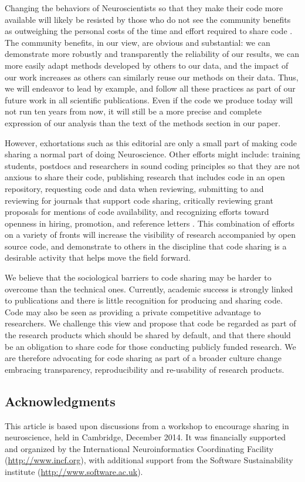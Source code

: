 \documentclass[11pt]{article}
\begin{document}
Changing the behaviors of Neuroscientists so that they make their code more available will likely be resisted by those who do not see the community benefits as outweighing the personal costs of the time and effort required to share code \cite{stodden2010scientific}. The community benefits, in our view, are obvious and substantial: we can demonstrate more robustly and transparently the reliability of our results, we can more easily adapt methods developed by others to our data, and the impact of our work increases as others can similarly reuse our methods on their data. Thus, we will endeavor to lead by example, and follow all these practices as part of our future work in all scientific publications. Even if the code we produce today will not run ten years from now, it will still be a more precise and complete expression of our analysis than the text of the methods section in our paper. 

However, exhortations such as this editorial are only a small part of making code sharing a normal part of doing Neuroscience. Other efforts might include: training students,  postdocs and researchers in sound coding principles so that they are not anxious to share their code, publishing research that includes code in an open repository, requesting code and data when reviewing, submitting to and reviewing for journals that support code sharing, critically reviewing grant proposals
 for mentions of code availability, and recognizing efforts toward openness in hiring, promotion, and reference letters \cite{leveque2012reproducible}. This combination of efforts on a variety of fronts will increase the visibility of research accompanied by open source code, and demonstrate to others in the discipline that code sharing is a desirable activity that helps move the field forward. 

We believe that the sociological barriers to code sharing may be harder to overcome than the technical ones. Currently, academic success is strongly linked to publications and there is little recognition for producing and sharing code. Code may also be seen as providing a private competitive advantage to researchers. We challenge this view and propose that code be regarded as part of the research products which should be shared by default, and that there should be an obligation to share code for those conducting publicly funded research. We are therefore advocating for code sharing as part of a broader culture change embracing transparency, reproducibility and re-usability of research products.   

\subsection*{Acknowledgments}

This article is based upon discussions from a workshop to encourage
sharing in neuroscience, held in Cambridge, December 2014.  It was
financially supported and organized by the International
Neuroinformatics Coordinating Facility (\url{http://www.incf.org}),
with additional support from the Software Sustainability institute
(\url{http://www.software.ac.uk}).


\printbibliography
\end{document}

